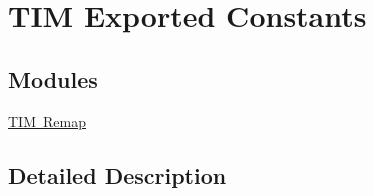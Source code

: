 \hypertarget{group___t_i_m_ex___exported___constants}{}\section{T\+IM Exported Constants}
\label{group___t_i_m_ex___exported___constants}
\subsection*{Modules}
\begin{DoxyCompactItemize}
\item 
\mbox{\hyperlink{group___t_i_m_ex___remap}{T\+I\+M Remap}}
\end{DoxyCompactItemize}


\subsection{Detailed Description}
